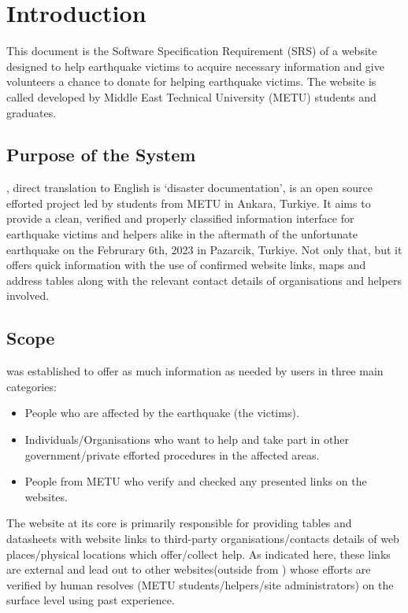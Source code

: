 \section{Introduction}

This document is the Software Specification Requirement (SRS) of a website designed to help earthquake victims to acquire necessary information and give volunteers a chance to donate for helping earthquake victims. The website is called \afetbilgi developed by Middle East Technical University (METU) students and graduates.

\subsection{Purpose of the System}

\afetbilgi, direct translation to English is `disaster documentation', is an open source efforted project led by students from METU in Ankara, Turkiye. It aims to provide a clean, verified and properly classified information interface for earthquake victims and helpers alike in the aftermath of the unfortunate earthquake on the Februrary  6th, 2023 in Pazarcik, Turkiye. Not only that, but it offers quick information with the use of confirmed website links, maps and address tables along with the relevant contact details of organisations and helpers involved.

\subsection{Scope}

\afetbilgi was established to offer as much information as needed by users in three main categories:
\begin{itemize}
  \item People who are affected by the earthquake (the victims). 
  \item Individuals/Organisations who want to help and take part in other government/private efforted procedures in the affected areas.
  \item People from METU who verify and checked any presented links on the websites.
\end{itemize}


The website at its core is primarily responsible for providing tables and datasheets with website links to third-party organisations/contacts details of web places/physical locations which offer/collect help. As indicated here, these links are external and lead out to other websites(outside from \afetbilgi) whose efforts are verified by human resolves (METU students/helpers/site administrators) on the surface level using past experience.


